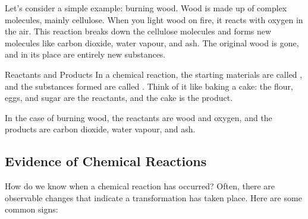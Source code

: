 Let's consider a simple example: burning wood. Wood is made up of complex molecules, mainly cellulose. When you light wood on fire, it reacts with oxygen in the air.  This reaction breaks down the cellulose molecules and forms new molecules like carbon dioxide, water vapour, and ash. The original wood is gone, and in its place are entirely new substances.

\begin{keyconcept}{Reactants and Products}
In a chemical reaction, the starting materials are called , and the substances formed are called .  Think of it like baking a cake: the flour, eggs, and sugar are the reactants, and the cake is the product.
\end{keyconcept}

In the case of burning wood, the reactants are wood and oxygen, and the products are carbon dioxide, water vapour, and ash.

\subsection{Evidence of Chemical Reactions}


How do we know when a chemical reaction has occurred?  Often, there are observable changes that indicate a transformation has taken place. Here are some common signs:

